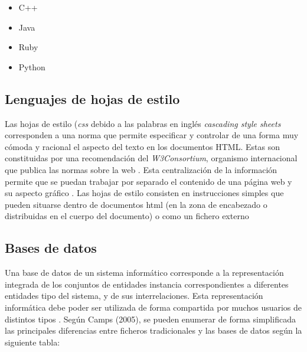 \begin{itemize}
\item C++
\item Java
\item Ruby
\item Python
\end{itemize}

\subsection{Lenguajes de hojas de estilo}


Las hojas de estilo (\textit{css} debido a las palabras en inglés \textit{cascading style sheets} corresponden a una norma que permite especificar y controlar de una forma muy cómoda y racional el aspecto del texto en los documentos HTML. Estas son constituidas por una recomendación del \textit{W3Consortium}, organismo internacional que publica las normas sobre la web \parencite{codina2012}. Esta centralización de la información permite que se puedan trabajar por separado el contenido de una página web y su aspecto gráfico \parencite{spip2012}. Las hojas de estilo consisten en instrucciones simples que pueden situarse dentro de documentos html (en la zona de encabezado o distribuidas en el cuerpo del documento) o como un fichero externo \parencite{codina2012}


\subsection{Bases de datos}

Una base de datos de un sistema informático corresponde a la representación integrada de los conjuntos de entidades instancia correspondientes a diferentes entidades tipo del sistema, y de sus interrelaciones. Esta representación informática debe poder ser utilizada de forma compartida por muchos usuarios de distintos tipos \parencite{camps2005}. Según Camps (2005), se pueden enumerar de forma simplificada las principales diferencias entre ficheros tradicionales y las bases de datos según la siguiente tabla:

